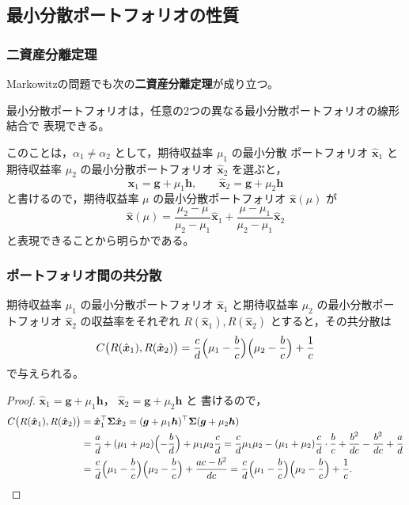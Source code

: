 \subsection{最小分散ポートフォリオの性質}

\subsubsection{二資産分離定理}

Markowitzの問題でも次の\textbf{二資産分離定理}が成り立つ。

\begin{theorem}[二資産分離定理]
最小分散ポートフォリオは，任意の2つの異なる最小分散ポートフォリオの線形結合で
表現できる。
\label{thm:two-fund}
\end{theorem}

このことは，$\alpha_1\neq\alpha_2$ として，期待収益率 $\mu_1$ の最小分散
ポートフォリオ $\hat{\bm{x}}_1$ と期待収益率 $\mu_2$ の最小分散ポートフォリオ
$\hat{\bm{x}}_2$ を選ぶと，
\[
\hat{\bm{x}}_1 = \bm{g} + \mu_1\bm{h},\qquad
\hat{\bm{x}}_2 = \bm{g} + \mu_2\bm{h}
\]
と書けるので，期待収益率 $\mu$ の最小分散ポートフォリオ $\hat{\bm{x}}(\mu)$ が
\begin{equation}
\hat{\bm{x}}(\mu) = \frac{\mu_2 - \mu}{\mu_2 - \mu_1}\hat{\bm{x}}_1
+ \frac{\mu - \mu_1}{\mu_2 - \mu_1}\hat{\bm{x}}_2
\end{equation}
と表現できることから明らかである。

\subsubsection{ポートフォリオ間の共分散}

\begin{theorem}
期待収益率 $\mu_1$ の最小分散ポートフォリオ $\hat{\bm{x}}_1$ と期待収益率
$\mu_2$ の最小分散ポートフォリオ $\hat{\bm{x}}_2$ の収益率をそれぞれ
$R(\hat{\bm{x}}_1), R(\hat{\bm{x}}_2)$ とすると，その共分散は
\begin{equation}
C\bigl(R(\hat{\bm{x}}_1), R(\hat{\bm{x}}_2)\bigr)
= \frac{c}{d}\Bigl(\mu_1 - \frac{b}{c}\Bigr)\Bigl(\mu_2 - \frac{b}{c}\Bigr)
+ \frac{1}{c}
\label{eq:mk-cov}
\end{equation}
で与えられる。
\label{thm:mk-cov}
\end{theorem}

\begin{proof}
$\hat{\bm{x}}_1 = \bm{g}+\mu_1\bm{h}$， $\hat{\bm{x}}_2 = \bm{g}+\mu_2\bm{h}$ と
書けるので，
\begin{align*}
C\bigl(R(\hat{\bm{x}}_1), R(\hat{\bm{x}}_2)\bigr)
&= \hat{\bm{x}}_1^\top\bm{\Sigma}\hat{\bm{x}}_2
= (\bm{g}+\mu_1\bm{h})^\top\bm{\Sigma}(\bm{g}+\mu_2\bm{h})\\
&= \frac{a}{d} + (\mu_1+\mu_2)\Bigl(-\frac{b}{d}\Bigr) + \mu_1\mu_2\frac{c}{d}
= \frac{c}{d}\mu_1\mu_2 - (\mu_1+\mu_2)\frac{c}{d}\cdot\frac{b}{c}
+ \frac{b^2}{dc} - \frac{b^2}{dc} + \frac{a}{d}\\
&= \frac{c}{d}\Bigl(\mu_1-\frac{b}{c}\Bigr)\Bigl(\mu_2-\frac{b}{c}\Bigr)
+ \frac{ac-b^2}{dc}
= \frac{c}{d}\Bigl(\mu_1-\frac{b}{c}\Bigr)\Bigl(\mu_2-\frac{b}{c}\Bigr)
+ \frac{1}{c}.\qedhere
\end{align*}
\end{proof}


